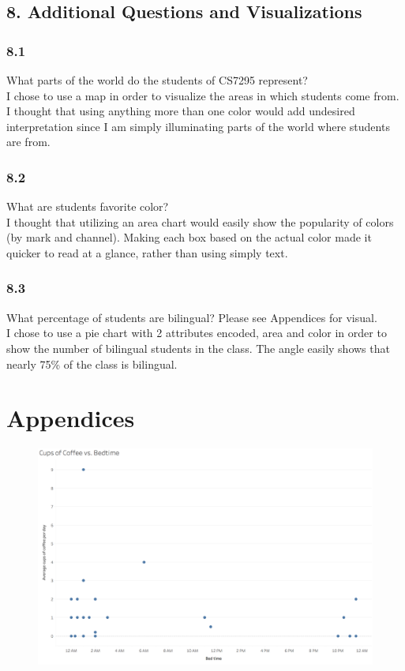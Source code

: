 \documentclass{neu_handout}
\begin{document}
\subsection*{8. Additional Questions and Visualizations}


\subsubsection*{8.1}

What parts of the world do the students of CS7295 represent?\\

I chose to use a map in order to visualize the areas in which students come from. I thought that using anything more than one color would add undesired interpretation since I am simply illuminating parts of the world where students are from.


\subsubsection*{8.2}
What are students favorite color? \\

I thought that utilizing an area chart would easily show the popularity of colors (by mark and channel). Making each box based on the actual color made it quicker to read at a glance, rather than using simply text.


\subsubsection*{8.3}
What percentage of students are bilingual? Please see Appendices for visual.\\

I chose to use a pie chart with 2 attributes encoded, area and color in order to show the number of bilingual students in the class. The angle easily shows that nearly 75\% of the class is bilingual.

\newpage

\appendix
\section{Appendices}

\begin{figure}[h]
\centering
{
\includegraphics[width=0.7\linewidth]{coffeevsbedtime}
}
\end{figure}
\end{document}
